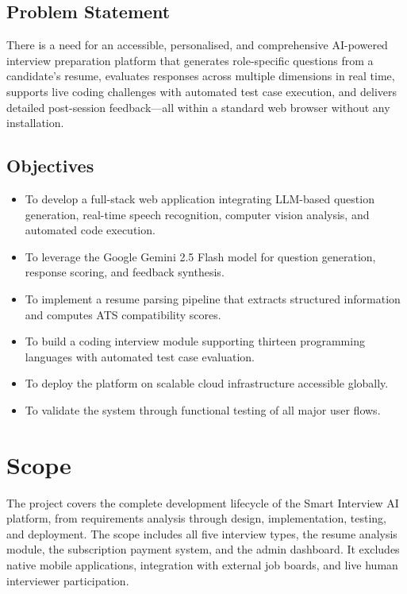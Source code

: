 \subsection*{Problem Statement}

There is a need for an accessible, personalised, and comprehensive AI-powered interview preparation platform that generates role-specific questions from a candidate's resume, evaluates responses across multiple dimensions in real time, supports live coding challenges with automated test case execution, and delivers detailed post-session feedback---all within a standard web browser without any installation.

\subsection*{Objectives}

\begin{itemize}
    \item To develop a full-stack web application integrating LLM-based question generation, real-time speech recognition, computer vision analysis, and automated code execution.
    \item To leverage the Google Gemini 2.5 Flash model for question generation, response scoring, and feedback synthesis.
    \item To implement a resume parsing pipeline that extracts structured information and computes ATS compatibility scores.
    \item To build a coding interview module supporting thirteen programming languages with automated test case evaluation.
    \item To deploy the platform on scalable cloud infrastructure accessible globally.
    \item To validate the system through functional testing of all major user flows.
\end{itemize}

\section{Scope}

The project covers the complete development lifecycle of the Smart Interview AI platform, from requirements analysis through design, implementation, testing, and deployment. The scope includes all five interview types, the resume analysis module, the subscription payment system, and the admin dashboard. It excludes native mobile applications, integration with external job boards, and live human interviewer participation.
